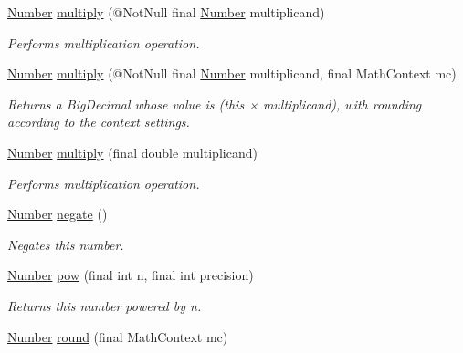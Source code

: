 \begin{DoxyCompactItemize}
\hyperlink{interfacecom_1_1aarrelaakso_1_1drawl_1_1_number}{Number} \hyperlink{interfacecom_1_1aarrelaakso_1_1drawl_1_1_number_a4748fed26ef4d662d7a277dc2687acca}{multiply} (@Not\+Null final \hyperlink{interfacecom_1_1aarrelaakso_1_1drawl_1_1_number}{Number} multiplicand)
\begin{DoxyCompactList}\small\item\em Performs multiplication operation. \end{DoxyCompactList}\item 
\hyperlink{interfacecom_1_1aarrelaakso_1_1drawl_1_1_number}{Number} \hyperlink{interfacecom_1_1aarrelaakso_1_1drawl_1_1_number_a8e43a4a565fb62b7f71a809aa791ecc2}{multiply} (@Not\+Null final \hyperlink{interfacecom_1_1aarrelaakso_1_1drawl_1_1_number}{Number} multiplicand, final Math\+Context mc)
\begin{DoxyCompactList}\small\item\em Returns a Big\+Decimal whose value is (this × multiplicand), with rounding according to the context settings. \end{DoxyCompactList}\item 
\hyperlink{interfacecom_1_1aarrelaakso_1_1drawl_1_1_number}{Number} \hyperlink{interfacecom_1_1aarrelaakso_1_1drawl_1_1_number_a47435944efde1dec963b401dbdf45d62}{multiply} (final double multiplicand)
\begin{DoxyCompactList}\small\item\em Performs multiplication operation. \end{DoxyCompactList}\item 
\hyperlink{interfacecom_1_1aarrelaakso_1_1drawl_1_1_number}{Number} \hyperlink{interfacecom_1_1aarrelaakso_1_1drawl_1_1_number_abeb61241a83c318464f15c0059d65885}{negate} ()
\begin{DoxyCompactList}\small\item\em Negates this number. \end{DoxyCompactList}\item 
\hyperlink{interfacecom_1_1aarrelaakso_1_1drawl_1_1_number}{Number} \hyperlink{interfacecom_1_1aarrelaakso_1_1drawl_1_1_number_a38679e8f0f11db201ee07e3b0541b6a4}{pow} (final int n, final int precision)
\begin{DoxyCompactList}\small\item\em Returns this number powered by n. \end{DoxyCompactList}\item 
\hyperlink{interfacecom_1_1aarrelaakso_1_1drawl_1_1_number}{Number} \hyperlink{interfacecom_1_1aarrelaakso_1_1drawl_1_1_number_aa49b7b3b06a362bdef37241652f35a44}{round} (final Math\+Context mc)

\end{DoxyCompactItemize}
